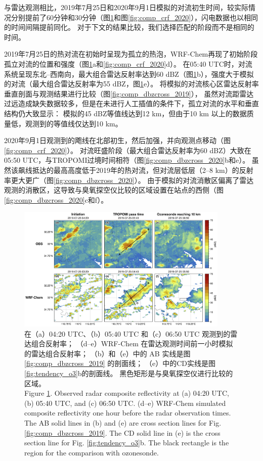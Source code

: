 与雷达观测相比，2019年7月25日和2020年9月1日模拟的对流初生时间，较实际情况分别提前了60分钟和30分钟（图\ref{fig:comp_crf_2019}和图\ref{fig:comp_crf_2020}），闪电数据也以相同的时间间隔提前同化。
对于下文的结果比较，我们选择匹配的阶段而不是相同的时间。

2019年7月25日的热对流在初始时呈现为孤立的热泡，WRF-Chem再现了初始阶段孤立对流的位置和强度（图\ref{fig:comp_crf_2019}a和\ref{fig:comp_crf_2020}d）。
在05:40 UTC时，对流系统呈现东北--西南向，最大组合雷达反射率达到60 dBZ（图\ref{fig:comp_crf_2019}b），强度大于模拟的对流（最大组合雷达反射率为55 dBZ，图\ref{fig:comp_crf_2019}e）。
将模拟的对流核心区雷达反射率垂直剖面与观测结果进行比较（图\ref{fig:comp_dbzcross_2019}），
虽然对流距雷达过远造成缺失数据较多，但是在未进行人工插值的条件下，孤立对流的水平和垂直结构仍大致显示：
模拟的45 dBZ等值线达到12 km，但由于10 km 以上的数据质量低，观测到的等值线仅达到10 km。

2020年9月1日观测到的飑线在北部初生，然后加强，并向观测点移动（图\ref{fig:comp_crf_2020}）。
对流旺盛阶段（最大组合雷达反射率为60 dBZ）大致在05:50 UTC，与TROPOMI过境时间相符（图\ref{fig:comp_dbzcross_2020}b和e）。
虽然该飙线抵达的最高高度低于2019年的热对流，但对流层低层（2--8 km）的反射率更大更广（图\ref{fig:comp_dbzcross_2020}）。
由于模拟的对流消散区偏离了雷达观测的消散区，这导致与臭氧探空仪比较的区域设置在站点的西侧（图\ref{fig:comp_dbzcross_2020}c和f）。


\begin{figure}[!htbp]
\centering
\includegraphics[width=0.9\textwidth]{./figures/comp_crf_2019.png}
\caption{在（a）04:20 UTC、（b）05:40 UTC 和（c）06:50 UTC 观测到的雷达组合反射率；
         （d--e）WRF-Chem 在雷达观测时间前一小时模拟的雷达组合反射率；
         （b）和（e）中的 AB 实线是图 \ref{fig:comp_dbzcross_2019} 的剖面线；
         （e）中的CD实线是图\ref{fig:tendency_o3}b的剖面线。
         黑色矩形是与臭氧探空仪进行比较的区域。\\
         Figure \ref{fig:comp_crf_2019}. Observed radar composite reflectivity at (a) 04:20 UTC, (b) 05:40 UTC, and (c) 06:50 UTC.
        (d--e) WRF-Chem simulated composite reflectivity one hour before the radar observation times.
        The AB solid lines in (b) and (e) are cross section lines for Fig. \ref{fig:comp_dbzcross_2019}.
        The CD solid line in (e) is the cross section line for Fig. \ref{fig:tendency_o3}b.
        The black rectangle is the region for the comparison with ozonesonde.}
\label{fig:comp_crf_2019}
\end{figure}

